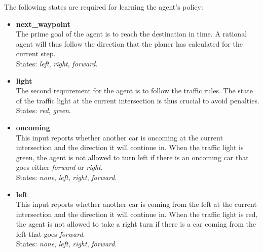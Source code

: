 \documentclass[11pt]{article}
\begin{document}
The following states are required for learning the agent's policy:
\begin{itemize}
    \item \textbf{next\_waypoint} \\
        The prime goal of the agent is to reach the destination in time. A rational agent will thus follow the direction that the planer has calculated for the current step.\\
        States: \textit{left}, \textit{right}, \textit{forward}.
    
    \item \textbf{light} \\
        The second requirement for the agent is to follow the traffic rules. The state of the traffic light at the current intersection is thus crucial to avoid penalties.\\
        States: \textit{red}, \textit{green}.

    \item \textbf{oncoming} \\
        This input reports whether another car is oncoming at the current intersection and the direction it will continue in. When the traffic light is green, the agent is not allowed to turn left if there is an oncoming
        car that goes either \textit{forward} or \textit{right}.\\
        States: \textit{none}, \textit{left}, \textit{right}, \textit{forward}.
        
    \item \textbf{left} \\
        This input reports whether another car is coming from the left at the current intersection and the direction it will continue in. When the traffic light is red, the agent is not allowed to take a right turn if there
        is a car coming from the left that goes \textit{forward}.\\
        States: \textit{none}, \textit{left}, \textit{right}, \textit{forward}.
    
\end{itemize}
\end{document}
